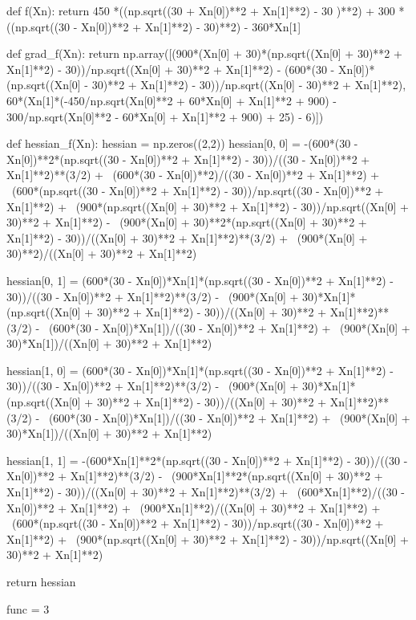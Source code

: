 \documentclass[10pt, a4paper]{article}
\begin{document}
\begin{python}
  def f(Xn):
    return 450 *((np.sqrt((30 + Xn[0])**2 + Xn[1]**2) - 30 )**2) + 300 *((np.sqrt((30 - Xn[0])**2 + Xn[1]**2) - 30)**2) - 360*Xn[1]

  def grad_f(Xn):
      return np.array([(900*(Xn[0] + 30)*(np.sqrt((Xn[0] + 30)**2 + Xn[1]**2) - 30))/np.sqrt((Xn[0] + 30)**2 + Xn[1]**2) - (600*(30 - Xn[0])*(np.sqrt((Xn[0] - 30)**2 + Xn[1]**2) - 30))/np.sqrt((Xn[0] - 30)**2 + Xn[1]**2),
                      60*(Xn[1]*(-450/np.sqrt(Xn[0]**2 + 60*Xn[0] + Xn[1]**2 + 900) - 300/np.sqrt(Xn[0]**2 - 60*Xn[0] + Xn[1]**2 + 900) + 25) - 6)])
      
  def hessian_f(Xn):
      hessian = np.zeros((2,2))
      hessian[0, 0] = -(600*(30 - Xn[0])**2*(np.sqrt((30 - Xn[0])**2 + Xn[1]**2) - 30))/((30 - Xn[0])**2 + Xn[1]**2)**(3/2) + \
      (600*(30 - Xn[0])**2)/((30 - Xn[0])**2 + Xn[1]**2) + \
      (600*(np.sqrt((30 - Xn[0])**2 + Xn[1]**2) - 30))/np.sqrt((30 - Xn[0])**2 + Xn[1]**2) + \
      (900*(np.sqrt((Xn[0] + 30)**2 + Xn[1]**2) - 30))/np.sqrt((Xn[0] + 30)**2 + Xn[1]**2) - \
      (900*(Xn[0] + 30)**2*(np.sqrt((Xn[0] + 30)**2 + Xn[1]**2) - 30))/((Xn[0] + 30)**2 + Xn[1]**2)**(3/2) + \
      (900*(Xn[0] + 30)**2)/((Xn[0] + 30)**2 + Xn[1]**2)
      
      hessian[0, 1] = (600*(30 - Xn[0])*Xn[1]*(np.sqrt((30 - Xn[0])**2 + Xn[1]**2) - 30))/((30 - Xn[0])**2 + Xn[1]**2)**(3/2) - \
      (900*(Xn[0] + 30)*Xn[1]*(np.sqrt((Xn[0] + 30)**2 + Xn[1]**2) - 30))/((Xn[0] + 30)**2 + Xn[1]**2)**(3/2) - \
      (600*(30 - Xn[0])*Xn[1])/((30 - Xn[0])**2 + Xn[1]**2) + \
      (900*(Xn[0] + 30)*Xn[1])/((Xn[0] + 30)**2 + Xn[1]**2)
      
      hessian[1, 0] = (600*(30 - Xn[0])*Xn[1]*(np.sqrt((30 - Xn[0])**2 + Xn[1]**2) - 30))/((30 - Xn[0])**2 + Xn[1]**2)**(3/2) - \
      (900*(Xn[0] + 30)*Xn[1]*(np.sqrt((Xn[0] + 30)**2 + Xn[1]**2) - 30))/((Xn[0] + 30)**2 + Xn[1]**2)**(3/2) - \
      (600*(30 - Xn[0])*Xn[1])/((30 - Xn[0])**2 + Xn[1]**2) + \
      (900*(Xn[0] + 30)*Xn[1])/((Xn[0] + 30)**2 + Xn[1]**2)
      
      hessian[1, 1] = -(600*Xn[1]**2*(np.sqrt((30 - Xn[0])**2 + Xn[1]**2) - 30))/((30 - Xn[0])**2 + Xn[1]**2)**(3/2) - \
      (900*Xn[1]**2*(np.sqrt((Xn[0] + 30)**2 + Xn[1]**2) - 30))/((Xn[0] + 30)**2 + Xn[1]**2)**(3/2) + \
      (600*Xn[1]**2)/((30 - Xn[0])**2 + Xn[1]**2) + \
      (900*Xn[1]**2)/((Xn[0] + 30)**2 + Xn[1]**2) + \
      (600*(np.sqrt((30 - Xn[0])**2 + Xn[1]**2) - 30))/np.sqrt((30 - Xn[0])**2 + Xn[1]**2) + \
      (900*(np.sqrt((Xn[0] + 30)**2 + Xn[1]**2) - 30))/np.sqrt((Xn[0] + 30)**2 + Xn[1]**2)
      
      return hessian

  func = 3
\end{python}
\end{document}
